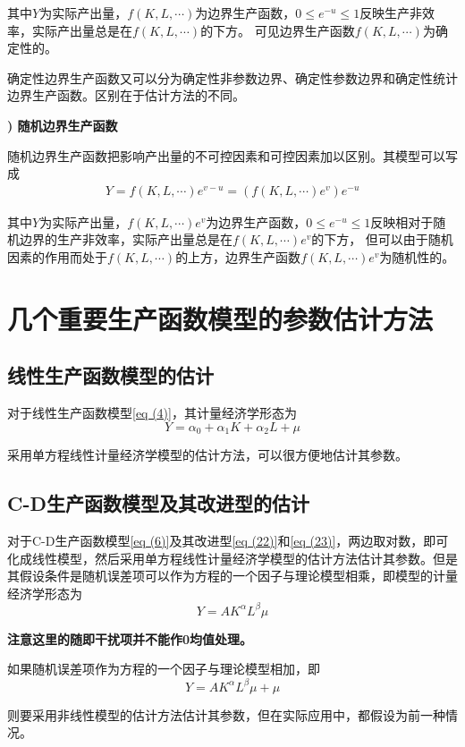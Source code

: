 	其中$ Y $为实际产出量，$ f(K, L, \cdots) $为边界生产函数，$ 0 \leq e^{-u} \leq 1 $反映生产非效率，实际产出量总是在$ f(K, L, \cdots) $的下方。
	可见边界生产函数$ f(K, L, \cdots) $为确定性的。
		
	确定性边界生产函数又可以分为确定性非参数边界、确定性参数边界和确定性统计边界生产函数。区别在于估计方法的不同。
		
{\bf {}) 随机边界生产函数}
		
	随机边界生产函数把影响产出量的不可控因素和可控因素加以区别。其模型可以写成
	\begin{align}
		Y=f(K, L, \cdots) e^{v-u}=\left(f(K, L, \cdots) e^{v}\right) e^{-u}
	\end{align}
		
	其中$ Y $为实际产出量，$ f(K, L, \cdots) e^{v} $为边界生产函数，$ 0 \leq e^{-u} \leq 1 $反映相对于随机边界的生产非效率，实际产出量总是在$ f(K, L, \cdots) e^{v} $的下方，
	但可以由于随机因素的作用而处于$ f(K, L, \cdots) $的上方，边界生产函数$ f(K, L, \cdots) e^{v} $为随机性的。

\section{几个重要生产函数模型的参数估计方法}
\subsection{线性生产函数模型的估计} 
		
	对于线性生产函数模型\eqref{eq (4)}，其计量经济学形态为
	$$ Y=\alpha_{0}+\alpha_{1} K+\alpha_{2} L+\mu $$

	采用单方程线性计量经济学模型的估计方法，可以很方便地估计其参数。
		
\subsection{C-D生产函数模型及其改进型的估计}
		
	对于C-D生产函数模型\eqref{eq (6)}及其改进型\eqref{eq (22)}和\eqref{eq (23)}，两边取对数，即可化成线性模型，然后采用单方程线性计量经济学模型的估计方法估计其参数。但是其假设条件是随机误差项可以作为方程的一个因子与理论模型相乘，即模型的计量经济学形态为
	$$ Y=A K^{\alpha} L^{\beta} \mu $$

	\textbf{注意这里的随即干扰项并不能作0均值处理。}
		
	如果随机误差项作为方程的一个因子与理论模型相加，即
	$$ Y=A K^{\alpha} L^{\beta} \mu+\mu $$
		
	则要采用非线性模型的估计方法估计其参数，但在实际应用中，都假设为前一种情况。
		
